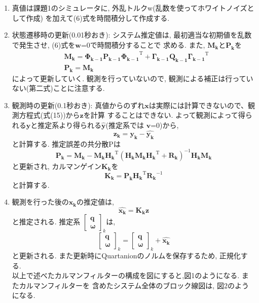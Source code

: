 \documentclass[class=article, crop=false, dvipdfmx, fleqn]{standalone}
\begin{document}
\begin{enumerate}
  \item 真値は課題1のシミュレータに, 外乱トルクw(乱数を使ってホワイトノイズとして作成)
  を加えて(6)式を時間積分して作成する.
  \item 状態遷移時の更新(0.01秒おき): システム推定値は, 最初適当な初期値を乱数で発生させ, (6)式を$\bm{w}$=0で時間積分することで
  求める. また, $\bm{M_k}$と$\bm{P_k}$を
  \begin{align}
    &\bm{M_k} = \bm{\Phi_{k-1}} \bm{P_{k-1}} {\bm{\Phi_{k-1}}}^{\mathrm{T}} +
    \bm{\Gamma_{k-1}} \bm{Q_{k-1}} {\bm{\Gamma_{k-1}}}^{\mathrm{T}} \\
    &\bm{P_k} = \bm{M_k}
  \end{align}
  によって更新していく. 観測を行っていないので, 観測による補正は行っていない(第二式)ことに注意する.
  \item 観測時の更新(0.1秒おき): 真値からのずれ$\bm{x}$は実際には計算できないので、観測方程式(式(15))から$\bm{z}$を計算
  することはできない. よって観測によって得られる$\bm{y}$と推定系より得られる$\hat{\bm{y}}$(推定系では
  $\bm{v}$=0)から,
  \begin{equation}
    \bm{z_k} = \bm{y_k} - \hat{\bm{y_k}}
  \end{equation}
  と計算する. 推定誤差の共分散Pは
  \begin{equation}
    \bm{P_k} = \bm{M_k} - \bm{M_k}{\bm{H_k}}^{\mathrm{T}}{(\bm{H_k}\bm{M_k}{\bm{H_k}}^{\mathrm{T}} + \bm{R_k})}^{-1}
    \bm{H_k}\bm{M_k}
  \end{equation}
  と更新され, カルマンゲイン$\bm{K_k}$を
  \begin{equation}
    \bm{K_k} = \bm{P_k}{\bm{H_k}}^{\mathrm{T}}{\bm{R_k}}^{-1}
  \end{equation}
  と計算する.
  \item 観測を行った後の$\bm{x_k}$の推定値は,
  \begin{equation}
    \hat{\bm{x_k}} = \bm{K_k}\bm{z}
  \end{equation}
  と推定される. 推定系
  $
  {\begin{bmatrix}
    \bm{q} \\
    \bm{\omega}
  \end{bmatrix}}_k
  $は,
  \begin{equation}
    {\begin{bmatrix}
      \bm{q} \\
      \bm{\omega}
    \end{bmatrix}}_k =
    {\begin{bmatrix}
      \bm{q} \\
      \bm{\omega}
    \end{bmatrix}}_k + \hat{\bm{x_k}}
  \end{equation}
  と更新される. また更新時にQuartanionのノルムを保存するため, 正規化する. \\
  以上で述べたカルマンフィルターの構成を図にすると,図1のようになる. またカルマンフィルターを
  含めたシステム全体のブロック線図は, 図2のようになる.


\end{enumerate}
\end{document}
